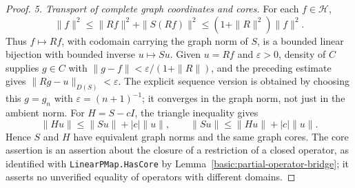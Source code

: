 \documentclass[11pt,a4paper]{article}
\theoremstyle{definition}
\theoremstyle{remark}
\begin{document}
\begin{proof}
\emph{5. Transport of complete graph coordinates and cores.}
For each $f\in\mathcal H$,
\[
 \|f\|^2\leq\|Rf\|^2+\|S(Rf)\|^2
 \leq(1+\|R\|^2)\|f\|^2.
\]
Thus $f\mapsto Rf$, with codomain carrying the graph norm of
$S$, is a bounded linear bijection with bounded inverse $u\mapsto
Su$. Given $u=Rf$ and $\varepsilon>0$, density of $C$ supplies
$g\in C$ with
$\|g-f\|<\varepsilon/(1+\|R\|)$, and the preceding estimate
gives $\|Rg-u\|_{D(S)}<\varepsilon$. The explicit sequence
version is obtained by choosing this $g=g_n$ with
$\varepsilon=(n+1)^{-1}$; it converges in the graph norm, not just
in the ambient norm. For $H=S-cI$, the triangle inequality gives
\[
 \|Hu\|\leq\|Su\|+|c|\|u\|,\qquad
 \|Su\|\leq\|Hu\|+|c|\|u\|.
\]
Hence $S$ and $H$ have equivalent graph norms and the same graph
cores. The core assertion is an assertion about the closure of a
restriction of a closed operator, as identified with
\nolinkurl{LinearPMap.HasCore} by
Lemma~\ref{basic:partial-operator-bridge}; it asserts no unverified
equality of operators with different domains.
\end{proof}
\end{document}
